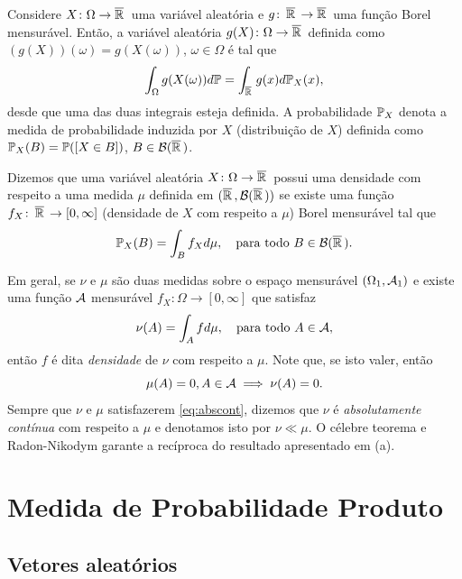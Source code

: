 \begin{theorem}
	Considere  $X\colon\Omega \to \Ree$ uma variável aleatória e  $g\colon\Ree \to \Ree$ uma função Borel mensurável. Então, a variável aleatória $g(X)\colon \Omega \to \Ree$ definida como \((g(X))(\omega) = g(X(\omega))\), $\omega\in\Omega$ é tal que
	\[
		\int_\Omega g(X(\omega))d\P = \int_{\Ree} g(x)d\P_X(x),
	\]
%
desde que uma das duas integrais esteja definida. A probabilidade $\P_X$ denota a medida de probabilidade induzida por $X$ (distribuição de $X$) definida como $\P_X(B) = \P([X\in B])$, $B\in\Boe$.
\end{theorem}

\begin{definition}
	Dizemos que uma variável aleatória $X\colon\Omega \to \Ree$ possui uma densidade com respeito a uma medida $\mu$ definida em $(\Ree, \Boe)$ se existe uma função $f_X\colon\Ree \to [0, \infty]$ (densidade de $X$ com respeito a $\mu$) Borel mensurável tal que 
	\[
		\P_X(B) = \int_B f_X d\mu, \quad \text{para todo } B \in \Boe. 
	\]
\end{definition}

\begin{note}
	\leavevmode
	\begin{outline}[enumerate]
		\renewcommand{\labelenumi}{(\alph{enumi})}
		\1 Em geral, se $\nu$ e $\mu$ são duas medidas sobre o espaço mensurável $(\Omega_1, \Acal_1)$ e existe uma função $\Acal$ mensurável $f_X\colon\Omega \to [0, \infty]$ que satisfaz
		\[
				\nu(A) = \int_A f d\mu, \quad \text{para todo } A \in \Acal,
		\]
		então $f$ é dita \textit{densidade} de $\nu$ com respeito a $\mu$. Note que, se isto valer, então
		\begin{equation}\label{eq:abscont}
			\mu(A) = 0, A \in \Acal \implies \nu(A) = 0.
		\end{equation}
		\1 Sempre que $\nu$ e $\mu$ satisfazerem \ref{eq:abscont}, dizemos que $\nu$ é \textit{absolutamente contínua} com respeito a $\mu$ e denotamos isto por $\nu \ll \mu$. O célebre teorema e Radon-Nikodym garante a recíproca do resultado apresentado em (a).
	\end{outline}
\end{note}

\section{Medida de Probabilidade Produto}

\subsection{Vetores aleatórios}

